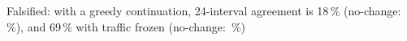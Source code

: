Falsified: with a greedy continuation, 24-interval agreement is 18\,\% (no-change: \SeqLiveAgreeHTwentyFour\,\%), and 69\,\% with traffic frozen (no-change: \SeqFrozenAgreeHTwentyFour\,\%)
